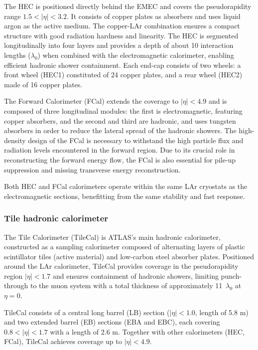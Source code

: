 The HEC is positioned directly behind the EMEC and covers the pseudorapidity range $1.5 < |\eta| < 3.2$. It consists of copper plates as absorbers and uses liquid argon as the active medium. The copper-LAr combination ensures a compact structure with good radiation hardness and linearity. The HEC is segmented longitudinally into four layers and provides a depth of about 10 interaction lengths ($\lambda_0$) when combined with the electromagnetic calorimeter, enabling efficient hadronic shower containment. Each end-cap consists of two wheels: a front wheel (HEC1) constituted of 24 copper plates, and a rear wheel (HEC2) made of 16 copper plates.

The Forward Calorimeter (FCal) extends the coverage to $|\eta| < 4.9$ and is composed of three longitudinal modules: the first is electromagnetic, featuring copper absorbers, and the second and third are hadronic, and uses tungsten absorbers in order to reduce the lateral spread of the hadronic showers. The high-density design of the FCal is necessary to withstand the high particle flux and radiation levels encountered in the forward region. Due to its crucial role in reconstructing the forward energy flow, the FCal is also essential for pile-up suppression and missing transverse energy reconstruction.

Both HEC and FCal calorimeters operate within the same LAr cryostats as the electromagnetic sections, benefitting from the same stability and fast response. 

\subsubsection{Tile hadronic calorimeter}
\label{sec:tilecal}

The Tile Calorimeter (TileCal) is ATLAS's main hadronic calorimeter, constructed as a sampling calorimeter composed of alternating layers of plastic scintillator tiles (active material) and low-carbon steel absorber plates. Positioned around the LAr calorimeter, TileCal provides coverage in the pseudorapidity region $|\eta|<1.7$ and ensures containment of hadronic showers, limiting punch-through to the muon system with a total thickness of approximately 11~$\lambda_0$ at $\eta=0$.

TileCal consists of a central long barrel (LB) section ($|\eta|<1.0$, length of 5.8 m) and two extended barrel (EB) sections (EBA and EBC), each covering $0.8<|\eta|<1.7$ with a length of 2.6 m. Together with other calorimeters (HEC, FCal), TileCal achieves coverage up to $|\eta|<4.9$.

